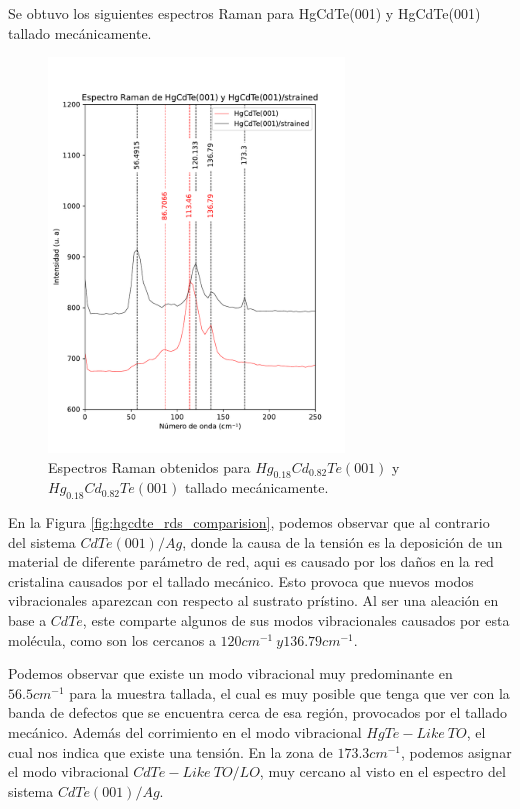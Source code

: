 Se obtuvo los siguientes espectros Raman para HgCdTe(001) y HgCdTe(001) tallado mecánicamente.
\begin{figure}[H]
    \centering
    \includegraphics[width=0.7\textwidth]{figures/chap4/hgcdte-strained/raman-results/raman-HgCdTe-250.pdf}
        \caption{Espectros Raman obtenidos para $ Hg_{0.18}Cd_{0.82}Te (001)$ y 
        $ Hg_{0.18}Cd_{0.82}Te (001)$ tallado mecánicamente.}
    \label{fig:hgcdte_rds_250}
\end{figure}

En la Figura \ref{fig:hgcdte_rds_comparision}, podemos observar que al contrario del sistema $CdTe(001)/Ag$, donde la causa de la tensión es la deposición de un material de diferente parámetro de red, aqui es causado por los daños en la red cristalina causados por el tallado mecánico. Esto provoca que nuevos modos vibracionales aparezcan con respecto al sustrato prístino. Al ser una aleación en base a $CdTe$, este comparte algunos de sus modos vibracionales causados por esta molécula, como son los cercanos a $120cm^{-1}\ y  136.79cm^{-1}$.\cite{Qiu2021}

Podemos observar que existe un modo vibracional muy predominante en $56.5 cm^{-1}$ para la muestra tallada, el cual es muy posible que tenga que ver con la banda de defectos que se encuentra cerca de esa región, provocados por el tallado mecánico. Además del corrimiento en el modo vibracional $HgTe-Like\ TO$, el cual nos indica que existe una tensión. En la zona de $173.3cm^{-1}$, podemos asignar el modo vibracional $CdTe-Like\ TO/LO$, muy cercano al visto en el espectro del sistema $CdTe(001)/Ag$.

